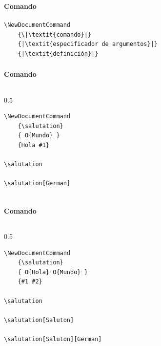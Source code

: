 \documentclass[12pt,aspectratio=169,ignorenonframetext]{ltxbeamer}
\begin{document}
\begin{frame}[fragile]
\frametitle{{\lmr{}}}
\framesubtitle{Comando}

\begin{verbatim}
\NewDocumentCommand
    {\|\textit{comando}|}
    {|\textit{especificador de argumentos}|}
    {|\textit{definición}|}
\end{verbatim}
\end{frame}





\begin{frame}[fragile]
\frametitle{{\lmr{}}}
\framesubtitle{Comando}

\begin{columns}
    \begin{column}{0.5\textwidth}
        \begin{verbatim}
\NewDocumentCommand
    {\salutation}
    { O{Mundo} }
    {Hola #1}

\salutation

\salutation[German]
        \end{verbatim}
    \end{column}
    {\color{gray} \vline}
\end{columns}
\end{frame}





\begin{frame}[fragile]
\frametitle{{\lmr{}}}
\framesubtitle{Comando}

\begin{columns}
    \begin{column}{0.5\textwidth}
        \begin{verbatim}
\NewDocumentCommand
    {\salutation}
    { O{Hola} O{Mundo} }
    {#1 #2}

\salutation

\salutation[Saluton]

\salutation[Saluton][German]
        \end{verbatim}
    \end{column}
    {\color{gray} \vline}
\end{columns}
\end{frame}
\end{document}
